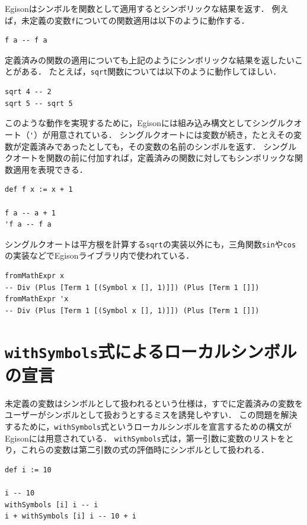 Egisonはシンボルを関数として適用するとシンボリックな結果を返す．
例えば，未定義の変数\lstinline{f}についての関数適用は以下のように動作する．
\begin{lstlisting}[language=egison,numbers=none]
f a -- f a
\end{lstlisting}
定義済みの関数の適用についても上記のようにシンボリックな結果を返したいことがある．
たとえば，\lstinline{sqrt}関数については以下のように動作してほしい．
\begin{lstlisting}[language=egison,numbers=none]
sqrt 4 -- 2
sqrt 5 -- sqrt 5
\end{lstlisting}
このような動作を実現するために，Egisonには組み込み構文としてシングルクオート（\lstinline{'}）が用意されている．
シングルクオートには変数が続き，たとえその変数が定義済みであったとしても，その変数の名前のシンボルを返す．
シングルクオートを関数の前に付加すれば，定義済みの関数に対してもシンボリックな関数適用を表現できる．
\begin{lstlisting}[language=egison,numbers=none]
def f x := x + 1

f a -- a + 1
'f a -- f a
\end{lstlisting}
シングルクオートは平方根を計算する\lstinline{sqrt}の実装以外にも，三角関数\lstinline{sin}や\lstinline{cos}の実装などでEgisonライブラリ内で使われている．

\begin{lstlisting}[language=egison,numbers=none]
fromMathExpr x
-- Div (Plus [Term 1 [(Symbol x [], 1)]]) (Plus [Term 1 []])
fromMathExpr 'x
-- Div (Plus [Term 1 [(Symbol x [], 1)]]) (Plus [Term 1 []])
\end{lstlisting}

\section{\texttt{withSymbols}式によるローカルシンボルの宣言}\label{mexpr-withsym}

未定義の変数はシンボルとして扱われるという仕様は，すでに定義済みの変数をユーザーがシンボルとして扱おうとするミスを誘発しやすい．
この問題を解決するために，\lstinline{withSymbols}式というローカルシンボルを宣言するための構文がEgisonには用意されている．
\lstinline{withSymbols}式は，第一引数に変数のリストをとり，これらの変数は第二引数の式の評価時にシンボルとして扱われる．
\begin{lstlisting}[language=egison,numbers=none]
def i := 10

i -- 10
withSymbols [i] i -- i
i + withSymbols [i] i -- 10 + i
\end{lstlisting}

